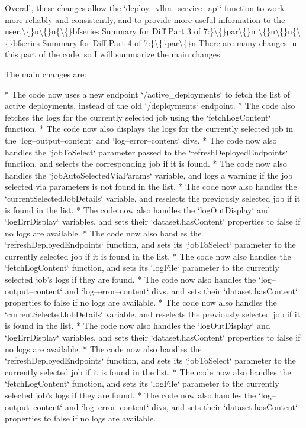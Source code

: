 \documentclass{article}
\begin{document}
{Overall, these changes allow the `deploy\_vllm\_service\_api` function to work more reliably and consistently, and to provide more useful information to the user.\textbackslash\{\}n\textbackslash\{\}n\{\textbackslash\{\}bfseries Summary for Diff Part 3 of 7:\}\textbackslash\{\}par\textbackslash\{\}n \textbackslash\{\}n\textbackslash\{\}n\{\textbackslash\{\}bfseries Summary for Diff Part 4 of 7:\}\textbackslash\{\}par\textbackslash\{\}n  There are many changes in this part of the code, so I will summarize the main changes.

The main changes are:

* The code now uses a new endpoint `/active\_deployments` to fetch the list of active deployments, instead of the old `/deployments` endpoint.
* The code also fetches the logs for the currently selected job using the `fetchLogContent` function.
* The code now also displays the logs for the currently selected job in the `log--output--content` and `log--error--content` divs.
* The code now also handles the `jobToSelect` parameter passed to the `refreshDeployedEndpoints` function, and selects the corresponding job if it is found.
* The code now also handles the `jobAutoSelectedViaParams` variable, and logs a warning if the job selected via parameters is not found in the list.
* The code now also handles the `currentSelectedJobDetails` variable, and reselects the previously selected job if it is found in the list.
* The code now also handles the `logOutDisplay` and `logErrDisplay` variables, and sets their `dataset.hasContent` properties to false if no logs are available.
* The code now also handles the `refreshDeployedEndpoints` function, and sets its `jobToSelect` parameter to the currently selected job if it is found in the list.
* The code now also handles the `fetchLogContent` function, and sets its `logFile` parameter to the currently selected job's logs if they are found.
* The code now also handles the `log--output--content` and `log--error--content` divs, and sets their `dataset.hasContent` properties to false if no logs are available.
* The code now also handles the `currentSelectedJobDetails` variable, and reselects the previously selected job if it is found in the list.
* The code now also handles the `logOutDisplay` and `logErrDisplay` variables, and sets their `dataset.hasContent` properties to false if no logs are available.
* The code now also handles the `refreshDeployedEndpoints` function, and sets its `jobToSelect` parameter to the currently selected job if it is found in the list.
* The code now also handles the `fetchLogContent` function, and sets its `logFile` parameter to the currently selected job's logs if they are found.
* The code now also handles the `log--output--content` and `log--error--content` divs, and sets their `dataset.hasContent` properties to false if no logs are available.

}
\end{document}
